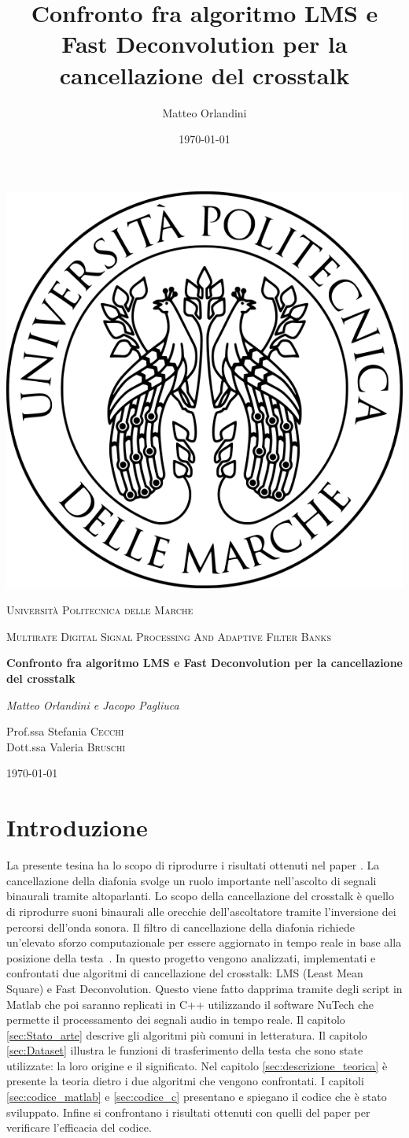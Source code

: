 \documentclass[12pt,a4paper,titlepage]{article}
\title{Confronto fra algoritmo LMS e Fast Deconvolution per la cancellazione del crosstalk}
\author{Matteo Orlandini}
\date{\today}
\begin{document}
\begin{titlepage}
	
	\centering
	\includegraphics[width=.2\textwidth]{Immagini/univpmlogo}\par\vspace{1cm}
	{\scshape\LARGE Università Politecnica delle Marche\par}
	\vspace{1cm}
	{\scshape\Large Multirate Digital Signal Processing And Adaptive Filter Banks \par}
	\vspace{1.5cm}
	{\huge\bfseries Confronto fra algoritmo LMS e Fast Deconvolution per la cancellazione del crosstalk \par}
	\vspace{2cm}
	{\Large\itshape Matteo Orlandini e Jacopo Pagliuca\par}
	\vfill
	Prof.ssa Stefania \textsc{Cecchi}\\
	Dott.ssa Valeria \textsc{Bruschi}
	
	\vfill
	
	{\large \today\par}
\end{titlepage}

\thispagestyle{empty}
\tableofcontents

\newpage
\setcounter{page}{1}
\section{Introduzione}
La presente tesina ha lo scopo di riprodurre i risultati ottenuti nel paper \cite{Li:comprehensive_comparison}. 
La cancellazione della diafonia svolge un ruolo importante nell'ascolto di segnali binaurali tramite altoparlanti. Lo scopo della cancellazione del crosstalk è quello di riprodurre suoni binaurali alle orecchie dell'ascoltatore tramite l'inversione dei percorsi dell'onda sonora. Il filtro di cancellazione della diafonia richiede un'elevato sforzo computazionale per essere aggiornato in tempo reale in base alla posizione della testa~\cite{wand:a_stereo_crosstalk}. In questo progetto vengono analizzati, implementati e confrontati due algoritmi di cancellazione del crosstalk: LMS (Least Mean Square) e Fast Deconvolution.
Questo viene fatto dapprima tramite degli script in Matlab che poi saranno replicati in C++ utilizzando il software NuTech che permette il processamento dei segnali audio in tempo reale.
Il capitolo \ref{sec:Stato_arte} descrive gli algoritmi più comuni in letteratura.
Il capitolo \ref{sec:Dataset} illustra le funzioni di trasferimento della testa che sono state utilizzate: la loro origine e il significato.
Nel capitolo \ref{sec:descrizione_teorica} è presente la teoria dietro i due algoritmi che vengono confrontati.
I capitoli \ref{sec:codice_matlab} e \ref{sec:codice_c} presentano e spiegano il codice che è stato sviluppato.
Infine si confrontano i risultati ottenuti con quelli del paper per verificare l'efficacia del codice.
\end{document}

